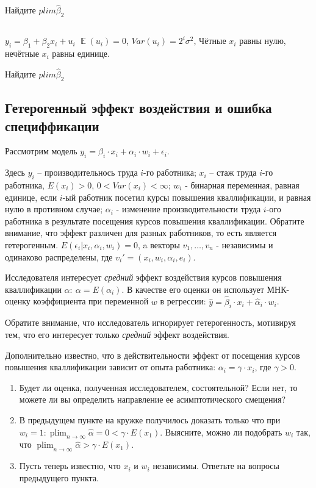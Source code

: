\documentclass[10pt, a4paper]{extarticle}
\def \hb{\hat{\beta}}
\DeclareMathOperator{\E}{\mathbb{E}}
\DeclareMathOperator{\plim}{plim}
\begin{document}
Найдите $plim \hb_2$

\subsection{}
$y_i = \beta_1 + \beta_2 x_i + u_i$
$\E(u_i) = 0$, $Var(u_i)=2^i\sigma^2$, 
Чётные $x_i$ равны нулю, нечётные $x_i$ равны единице.

Найдите $plim \hb_2$

\subsection{Гетерогенный эффект воздействия и ошибка специффикации}

Рассмотрим модель $y_{i} = \beta_{i} \cdot x_{i} + \alpha_{i} \cdot w_{i} + \epsilon_{i}$.

Здесь $y_{i}$ -- производительнось труда $i$-го работника; $x_{i}$ -- стаж труда $i$-го работника, $E(x_i)>0$, $0<Var(x_i)<\infty$; $w_{i}$ - бинарная переменная, равная единице, если $i$-ый работник посетил курсы повышения кваллификации, и равная нулю в противном случае; $\alpha_{i}$ - изменение производительности труда $i$-ого работника в результате посещения курсов повышения кваллификации. Обратите внимание, что эффект различен для разных работников, то есть является гетерогенным. $E(\epsilon_{i}|x_{i}, \alpha_{i}, w_{i})=0$, a векторы $v_{1}, \dots, v_{n}$ - независимы и одинаково распределены, где $v_{i}' = (x_{i}, w_{i}, \alpha_{i}, e_{i})$.

Исследователя интересует {\it средний} эффект воздействия курсов повышения кваллификации $\alpha:\ \alpha = E(\alpha_{i})$. В качестве его оценки он использует МНК-оценку коэффициента при переменной $w$ в регрессии: $\hat y = \hat \beta_{i} \cdot x_{i} + \hat \alpha_{i} \cdot w_{i}$.

Обратите внимание, что исследователь игнорирует гетерогенность, мотивируя тем, что его интересует только {\it средний} эффект воздействия.

Дополнительно известно, что в действительности эффект от посещения курсов повышения кваллификации зависит от опыта работника: $\alpha_{i} = \gamma \cdot x_i$, где $\gamma>0$. 

\begin{enumerate}
	\item  Будет ли оценка, полученная исследователем, состоятельной? Если нет, то можете ли вы определить направление ее асимптотического смещения?
	\item В предыдущем пункте на кружке получилось доказать только что при $w_{i} = 1: \plim_{n \to \infty} \hat \alpha = 0 < \gamma \cdot E(x_{1})$. Выясните, можно ли подобрать $w_{i}$ так, что $\plim_{n \to \infty} \hat \alpha > \gamma \cdot E(x_{1})$.
	\item Пусть теперь известно, что $x_{i}$ и $w_{i}$ независимы. Ответьте на вопросы предыдущего пункта.
\end{enumerate}
\end{document}
